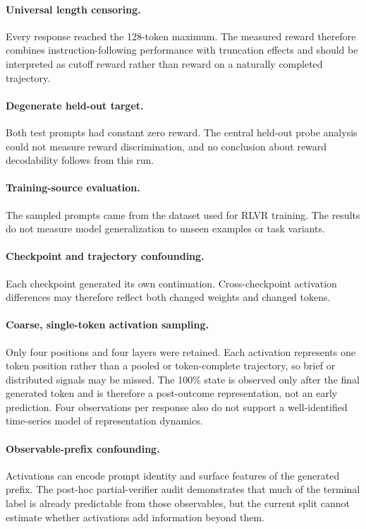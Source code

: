 \documentclass[manuscript,screen,nonacm]{acmart}
\begin{document}
\paragraph{Universal length censoring.}
Every response reached the 128-token maximum. The measured reward therefore
combines instruction-following performance with truncation effects and should
be interpreted as cutoff reward rather than reward on a naturally completed
trajectory.

\paragraph{Degenerate held-out target.}
Both test prompts had constant zero reward. The central held-out probe analysis
could not measure reward discrimination, and no conclusion about reward
decodability follows from this run.

\paragraph{Training-source evaluation.}
The sampled prompts came from the dataset used for RLVR training. The results do
not measure model generalization to unseen examples or task variants.

\paragraph{Checkpoint and trajectory confounding.}
Each checkpoint generated its own continuation. Cross-checkpoint activation
differences may therefore reflect both changed weights and changed tokens.

\paragraph{Coarse, single-token activation sampling.}
Only four positions and four layers were retained. Each activation represents
one token position rather than a pooled or token-complete trajectory, so brief
or distributed signals may be missed. The 100\% state is observed only after
the final generated token and is therefore a post-outcome representation, not
an early prediction. Four observations per response also do not support a
well-identified time-series model of representation dynamics.

\paragraph{Observable-prefix confounding.}
Activations can encode prompt identity and surface features of the generated
prefix. The post-hoc partial-verifier audit demonstrates that much of the
terminal label is already predictable from those observables, but the current
split cannot estimate whether activations add information beyond them.
\end{document}
